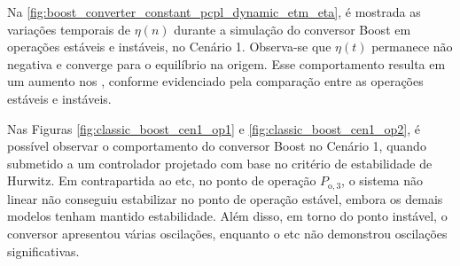 Na \autoref{fig:boost_converter_constant_pcpl_dynamic_etm_eta}, é mostrada as variações temporais de $\eta(n)$ durante a simulação do conversor Boost em operações estáveis e instáveis, no Cenário 1. Observa-se que $\eta(t)$ permanece não negativa e converge para o equilíbrio na origem. Esse comportamento resulta em um aumento nos , conforme evidenciado pela comparação entre as operações estáveis e instáveis.

Nas Figuras \ref{fig:classic_boost_cen1_op1} e \ref{fig:classic_boost_cen1_op2}, é possível observar o comportamento do conversor Boost no Cenário 1, quando submetido a um controlador projetado com base no critério de estabilidade de Hurwitz. Em contrapartida ao \acrshort{etc}, no ponto de operação $P_{\mathrm{o}, 3}$, o sistema não linear não conseguiu estabilizar no ponto de operação estável, embora os demais modelos tenham mantido estabilidade. Além disso, em torno do ponto instável, o conversor apresentou várias oscilações, enquanto o \acrshort{etc} não demonstrou oscilações significativas.

